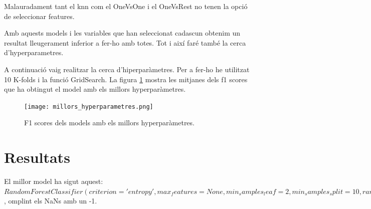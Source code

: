 \documentclass[9pt,a4paper,twoside]{tau-class/tau}
\begin{document}
    Malauradament tant el knn com el OneVsOne i el OneVsRest no tenen la opció de seleccionar features.

    Amb aquests models i les variables que han seleccionat cadascun obtenim un resultat lleugerament inferior a fer-ho amb totes. Tot i així faré també la cerca d'hyperparametres.

    A continuació vaig realitzar la cerca d'hiperparàmetres. Per a fer-ho he utilitzat 10 K-folds i la funció GridSearch. La figura \ref{fig:figure12} mostra les mitjanes dels f1 scores que ha obtingut el model amb els millors hyperparàmetres.


    \begin{figure}[H]
        \centering
        \texttt{[image: millors\_hyperparametres.png]}
        \caption{F1 scores dels models amb els millors hyperparàmetres.}
        \label{fig:figure12}
    \end{figure}
    
    \section{Resultats}

    El millor model ha sigut aquest: $RandomForestClassifier(criterion='entropy', max_features=None,
    min_samples_leaf=2, min_samples_split=10,
    random_state=20)$, omplint els NaNs amb un -1.
\end{document}
